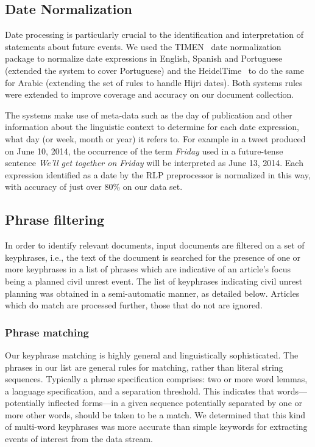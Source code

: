 \documentclass[letterpaper]{article}
\begin{document}
\subsection{Date Normalization}
Date processing is particularly crucial to the identification and
interpretation of statements about future events. We used the
TIMEN~\cite{LlorensDGS12} date normalization package to normalize date
expressions in English, Spanish and Portuguese (extended the system to
cover Portuguese) and the HeidelTime~\cite{strotgen2014time} to do the
same for Arabic (extending the set of rules to handle Hijri dates).
Both systems rules were extended to improve coverage and accuracy on our
document collection.

The systems make use of meta-data such as the day of publication and
other information about the linguistic context to determine for each
date expression, what day (or week, month or year) it refers to. For
example in a tweet produced on June 10, 2014, the occurrence of the
term {\em Friday} used in a future-tense sentence {\em We'll get
  together on Friday} will be interpreted as June 13, 2014.  Each
expression identified as a date by the RLP preprocessor is normalized
in this way, with accuracy of just over 80\% on our data set.

\subsection{Phrase filtering}
In order to identify relevant documents, input documents are filtered on
a set of keyphrases, i.e., the text of the document is searched for the
presence of one or more keyphrases in a list of phrases which are
indicative of an article's focus being a planned civil unrest event.
The list of keyphrases indicating civil unrest planning was obtained in
a semi-automatic manner, as detailed below.  Articles which do match are
processed further, those that do not are ignored.

\subsubsection{Phrase matching}
Our keyphrase matching is highly general and linguistically
sophisticated.  The phrases in our list are general rules for matching,
rather than literal string sequences. Typically a phrase specification
comprises: two or more word lemmas, a language specification, and a
separation threshold. This indicates that words---potentially inflected
forms---in a given sequence potentially separated by one or more other
words, should be taken to be a match. We determined that this kind of
multi-word keyphrases was more accurate than simple keywords for
extracting events of interest from the data stream.
\end{document}
